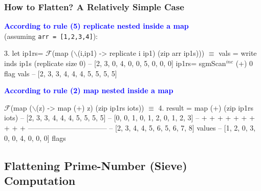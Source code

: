 \documentclass{beamer}
\newcommand{\blue}[1]{\textcolor{Blue}{{#1}}}
\renewcommand{\emph}[1]{\textcolor{structure}{#1}}
\newcommand{\emp}[1]{\textcolor{DikuRed}{ #1}}
\newcommand{\mymath}[1]{$ #1 $}
\newcommand{\myindu}[1]{^{#1}}
\begin{document}
\begin{frame}[fragile,t]
  \frametitle{How to Flatten? A Relatively Simple Case}

\blue{\bf According to rule (5) replicate nested inside a map}\\
(assuming {\tt arr = [1,2,3,4]}):

\bigskip

\begin{colorcode}
3. let ip1rs= \mymath{\mathcal{F}}(map (\mymath{\backslash}(i,ip1) -> replicate i ip1) (zip arr ip1s)))
\mymath{\equiv}
vals = write inds  ip1s (replicate size 0) -- [2, 3, 0, 4, 0, 0, 5, 0, 0, 0]
ip1rs= sgmScan\mymath{\myindu{inc}} (+) 0 flag \emp{vals}           \emph{-- [2, 3, 3, 4, 4, 4, 5, 5, 5, 5]}
\end{colorcode}

\bigskip

\blue{\bf According to rule (2) map nested inside a map}\\

\bigskip

\begin{colorcode}
\mymath{\mathcal{F}}(map (\mymath{\backslash}(z) -> map (+) z) (zip ip1rs iots))
\mymath{\equiv}
4. result = map (+) (zip ip1rs iots)
-- [2, 3, 3, 4, 4, 4, 5, 5, 5, 5]
-- [0, 0, 1, 0, 1, 2, 0, 1, 2, 3]
--  +  +  +  +  +  +  +  +  +  +
---------------------------------
\emph{-- [2, 3, 4, 4, 5, 6, 5, 6, 7, 8]} \emp{values}
\emph{-- [1, 2, 0, 3, 0, 0, 4, 0, 0, 0]} \emp{flags}
\end{colorcode}

\end{frame}




\subsection{Flattening Prime-Number (Sieve) Computation}

\begin{frame}[fragile]
	\tableofcontents[currentsubsection]
\end{frame}
\end{document}
